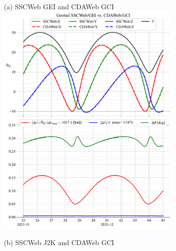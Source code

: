 \documentclass[draft]{agujournal2019}
\begin{document}

\clearpage
\begin{figure}[h]
     \begin{subfigure}[b]{0.49\textwidth}
         (a) SSCWeb GEI and CDAWeb GCI
         \centering
         \includegraphics[width=\textwidth]{figures/Geotail_SSCWeb-GEI_vs_CDAWeb-GCI.pdf}
     \end{subfigure}
     \begin{subfigure}[b]{0.49\textwidth}
         (b) SSCWeb J2K and CDAWeb GCI
         \centering

\end{subfigure}
\end{figure}
\end{document}
